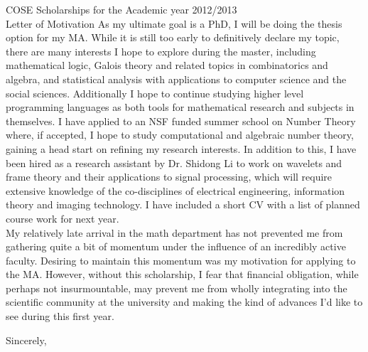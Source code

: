 \documentclass[11pt]{letter} %
\begin{document}
\begin{letter}{COSE Scholarships for the Academic year 2012/2013\\
 Letter of Motivation}
	As my ultimate goal is a PhD, I will be doing the thesis option for my MA. While it is still too early to definitively declare my topic, there are many interests I hope to explore during the master, including mathematical logic, Galois theory and related topics in combinatorics and algebra, and statistical analysis with applications to computer science and the social sciences.  Additionally I hope to continue studying higher level programming languages as both tools for mathematical research and subjects in themselves.  I have applied to an NSF funded summer school on Number Theory where, if accepted, I hope to study computational and algebraic number theory, gaining a head start on refining my research interests.   In addition to this, I have been hired as a research assistant by Dr. Shidong Li to work on wavelets and frame theory and their applications to signal processing, which will require extensive knowledge of the co-disciplines of electrical engineering, information theory and imaging technology.  I have included a short CV with a list of planned course work for next year.  \\
	
	My relatively late arrival in the math department has not prevented me from gathering quite a bit of momentum under the influence of an incredibly active faculty.  Desiring to maintain this momentum was my motivation for applying to the MA.  However, without this scholarship, I fear that financial obligation, while perhaps not insurmountable, may prevent me from wholly integrating into the scientific community at the university and making the kind of advances I'd like to see during this first year.  
	
	
    \closing{Sincerely,}
 
 

\end{letter}
 
 
 \newpage
\end{document}
